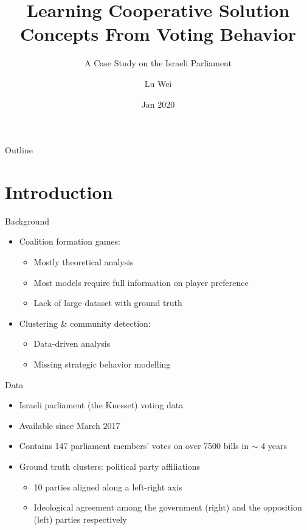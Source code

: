 \documentclass[xcolor=dvipsnames]{beamer}
\title{Learning Cooperative Solution Concepts From Voting Behavior}
\subtitle{A Case Study on the Israeli Parliament}
\author{Lu Wei}
\institute[National University of Singapore] %
{
  Department of Computer Science\\
  National University of Singapore
}
\date{Jan 2020}
\begin{document}
\begin{frame}
  \titlepage
\end{frame}

\begin{frame}{Outline}
  \tableofcontents
\end{frame}

\section{Introduction}

\begin{frame}{Background}
  \begin{itemize}
    \item Coalition formation games:
    \begin{itemize}
      \item Mostly theoretical analysis
      \item Most models require full information on player preference
      \item Lack of large dataset with ground truth
    \end{itemize}
    \item Clustering \& community detection:
    \begin{itemize}
      \item Data-driven analysis
      \item Missing strategic behavior modelling
    \end{itemize}
  \end{itemize}
\end{frame}

\begin{frame}{Data}
  \begin{itemize}
    \item Israeli parliament (the Knesset) voting data
    \item Available since March 2017
    \item Contains 147 parliament members' votes on over 7500 bills in $\sim$ 4 years
    \item Ground truth clusters: political party affiliations
    \begin{itemize}
      \item 10 parties aligned along a left-right axis
      \item Ideological agreement among the government (right) and the opposition (left) parties respectively
    \end{itemize}
  \end{itemize}
\end{frame}
\end{document}
